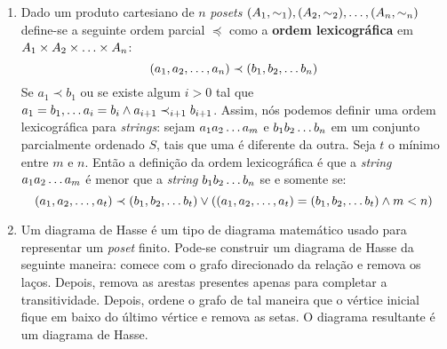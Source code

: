 \documentclass{article}
\begin{document}
\begin{enumerate}
	\item Dado um produto cartesiano de \( n \) \textit{posets} \( (A_1, \sim_1 ), (A_2, \sim_2 ), \mathellipsis , (A_n, \sim_n ) \) define-se a seguinte ordem parcial \( \preceq \) como a \textbf{ordem lexicográfica} em \( A_1 \times A_2 \times \mathellipsis \times A_n \):
	      \[ (a_1,a_2, \mathellipsis , a_n) \prec (b_1,b_2, \mathellipsis b_n) \]
	      Se \( a_1 \prec b_1 \) ou se existe algum \( i > 0 \) tal que \( a_1 = b_1, \mathellipsis a_i = b_i \land a_{i+1} \prec_{i+1} b_{i+1}\). Assim, nós podemos definir uma ordem lexicográfica para \textit{strings}: sejam \( a_1a_2 \mathellipsis a_m \) e \( b_1b_2 \mathellipsis b_n \) em um conjunto parcialmente ordenado \( S \), tais que uma é diferente da outra. Seja \( t \) o mínimo entre \( m \) e \( n \). Então a definição da ordem lexicográfica é que a \textit{string} \( a_1a_2 \mathellipsis a_m \) é menor que a \textit{string} \( b_1b_2 \mathellipsis b_n \) se e somente se:
	      \[ (a_1,a_2, \mathellipsis , a_t) \prec (b_1, b_2, \mathellipsis b_t) \lor ((a_1,a_2, \mathellipsis , a_t) = (b_1, b_2, \mathellipsis b_t) \land m < n) \]

	\item Um diagrama de Hasse é um tipo de diagrama matemático usado para representar um \textit{poset} finito. Pode-se construir um diagrama de Hasse da seguinte maneira: comece com o grafo direcionado da relação e remova os laços. Depois, remova as arestas presentes apenas para completar a transitividade. Depois, ordene o grafo de tal maneira que o vértice inicial fique em baixo do último vértice e remova as setas. O diagrama resultante é um diagrama de Hasse.

\end{enumerate}
\end{document}
